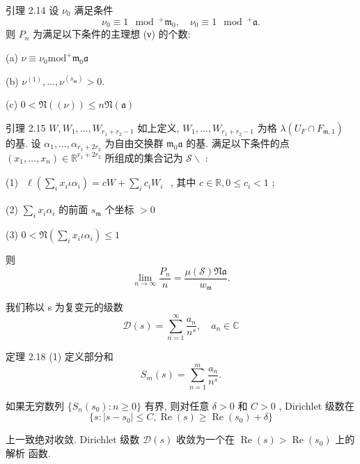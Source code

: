 \documentclass[]{article}
\begin{document}
{引理 2.14 设 $\nu _ { 0 }$ 满足条件$$
\nu_ {0} \equiv 1 \mod^ {+} \mathfrak {m} _ {0}, \quad \nu_ {0} \equiv 1 \mod^ {+} \mathfrak {a}.
$$ 则 $P _ { n }$ 为满足以下条件的主理想 (ν) 的个数: 

(a) $\nu \equiv \nu _ { 0 } { \mathrm { m o d } } ^ { + } { \mathfrak { m } } _ { 0 } { \mathfrak { a } }$ 

(b) $\nu ^ { ( 1 ) } , \ldots , \nu ^ { ( s _ { \mathfrak { m } } ) } > 0 .$ 

(c) $0 < \mathfrak { N } ( ( \nu ) ) \leqslant n \mathfrak { N } ( \mathfrak { a } )$ 

引理 2.15 $W , W _ { 1 } , \dots , W _ { r _ { 1 } + r _ { 2 } - 1 }$ 如上定义, $W _ { 1 } , \dots , W _ { r _ { 1 } + r _ { 2 } - 1 }$ 为格 $\lambda ( U _ { F } \cap F _ { \mathfrak { m } , 1 } )$ 的基. 设 $\alpha _ { 1 } , \ldots , \alpha _ { r _ { 1 } + 2 r _ { 2 } }$ 为自由交换群 $\mathfrak { m } _ { 0 } { \mathfrak { a } }$ 的基. 满足以下条件的点 $( x _ { 1 } , \ldots , x _ { n } ) \in \mathbb { R } ^ { r _ { 1 } + 2 r _ { 2 } }$ 所组成的集合记为 ${ \mathcal { S } } \backslash$ : 

(1) $\begin{array} { r } { \ell ( \sum _ { i } x _ { i } \iota \alpha _ { i } ) = c W + \sum _ { i } c _ { i } W _ { i } } \end{array}$ , 其中 $c \in \mathbb { R } , 0 \leqslant c _ { i } < 1$ ; 

(2) $\sum _ { i } x _ { i } \alpha _ { i }$ 的前面 $s _ { \mathfrak { m } }$ 个坐标 $> 0$ 

(3) $0 < \mathfrak { N } ( \sum _ { i } x _ { i } \iota \alpha _ { i } ) \leqslant 1$   

则 $$
\lim _ {n \to \infty} \frac {P _ {n}}{n} = \frac {\mu (\mathcal {S}) \mathfrak {N a}}{w _ {\mathfrak {m}}}.
$$

我们称以 s 为复变元的级数 $$
\mathcal {D} (s) = \sum_ {n = 1} ^ {\infty} \frac {a _ {n}}{n ^ {s}}, \quad a _ {n} \in \mathbb {C}
$$

定理 2.18 (1) 定义部分和 $$
S _ {m} (s) = \sum_ {n = 1} ^ {m} \frac {a _ {n}}{n ^ {s}}.
$$

如果无穷数列 $\{ S _ { n } ( s _ { 0 } ) : n \geqslant 0 \}$ 有界, 则对任意 $\delta > 0$ 和 $C > 0$ , Dirichlet 级数在$$
\{s: | s - s _ {0} | \leqslant C, \operatorname{Re} (s) \geqslant \operatorname{Re} (s _ {0}) + \delta \}
$$ 

上一致绝对收敛. Dirichlet 级数 ${ \mathcal { D } } ( s )$ 收敛为一个在 $\operatorname { R e } ( s ) > \operatorname { R e } ( s _ { 0 } )$ 上的解析 函数. 

}
\end{document}
